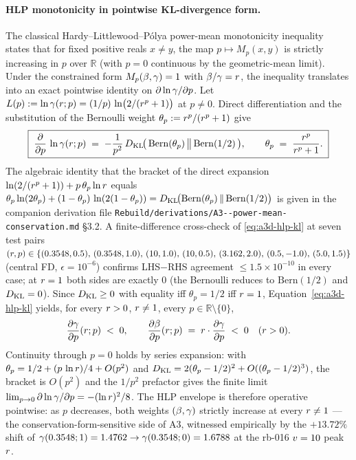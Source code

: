 \paragraph{HLP monotonicity in pointwise KL-divergence form.}
The classical Hardy--Littlewood--Pólya power-mean monotonicity
inequality~\cite{HLP1934} states that for fixed positive reals
$x \ne y$, the map $p \mapsto M_p(x, y)$ is strictly increasing in
$p$ over $\mathbb{R}$ (with $p = 0$ continuous by the
geometric-mean limit). Under the constrained form
$M_p(\beta, \gamma) = 1$ with $\beta/\gamma = r$, the
inequality translates into an exact pointwise identity on
$\partial \ln \gamma/\partial p$. Let
$L(p) := \ln \gamma(r; p) = (1/p)\,\ln\bigl(2/(r^p + 1)
\bigr)$ at $p \ne 0$. Direct differentiation and the substitution
of the Bernoulli weight
$\theta_p := r^p/(r^p + 1)$ give
\begin{equation}
  \boxed{\;
    \frac{\partial}{\partial p}\,\ln \gamma(r; p)
    \;=\;
    -\frac{1}{p^2}\,
    D_{\mathrm{KL}}\!\bigl(\,\mathrm{Bern}(\theta_p)\,\big\|\,
                    \mathrm{Bern}(1/2)\,\bigr),
    \qquad
    \theta_p \;=\; \frac{r^p}{r^p + 1}.
  \;}
  \label{eq:a3d-hlp-kl}
\end{equation}
The algebraic identity that the bracket of the direct expansion
$\ln(2/(r^p + 1)) + p\,\theta_p \ln r$ equals
$\theta_p \ln(2 \theta_p) + (1 - \theta_p)\,\ln(2(1 - \theta_p)) =
D_{\mathrm{KL}}\!\bigl(\mathrm{Bern}(\theta_p) \,\|\, \mathrm{Bern}(1/2)\bigr)$
is given in the companion derivation file
\texttt{Rebuild/derivations/A3{-}{-}power-mean-conservation.md}
§3.2. A finite-difference cross-check of
\eqref{eq:a3d-hlp-kl} at seven test pairs
$(r, p) \in \{(0.3548, 0.5),\,(0.3548, 1.0),\,(10, 1.0),\,
(10, 0.5),\,(3.162, 2.0),\,(0.5, -1.0),\,(5.0, 1.5)\}$
(central FD, $\epsilon = 10^{-6}$) confirms LHS$-$RHS agreement
$\le 1.5 \times 10^{-10}$ in every case; at $r = 1$ both sides
are exactly $0$ (the Bernoulli reduces to $\mathrm{Bern}(1/2)$ and
$D_{\mathrm{KL}} = 0$). Since $D_{\mathrm{KL}} \ge 0$ with equality iff
$\theta_p = 1/2$ iff $r = 1$,
Equation~\eqref{eq:a3d-hlp-kl} yields, for every $r > 0$,
$r \ne 1$, every $p \in \mathbb{R} \setminus \{0\}$,
\begin{equation}
  \frac{\partial \gamma}{\partial p}(r; p) \;<\; 0,
  \qquad
  \frac{\partial \beta}{\partial p}(r; p) \;=\;
  r \cdot \frac{\partial \gamma}{\partial p} \;<\; 0
  \quad (r > 0).
  \label{eq:a3d-mono-sign}
\end{equation}
Continuity through $p = 0$ holds by series expansion: with
$\theta_p = 1/2 + (p\,\ln r)/4 + O(p^2)$ and
$D_{\mathrm{KL}} = 2(\theta_p - 1/2)^2 + O((\theta_p - 1/2)^3)$, the bracket
is $O(p^2)$ and the $1/p^2$ prefactor gives the finite limit
$\lim_{p \to 0}\partial \ln \gamma/\partial p = -(\ln r)^2/8$.
The HLP envelope is therefore operative pointwise: as $p$
decreases, both weights $(\beta, \gamma)$ strictly increase at
every $r \ne 1$ — the conservation-form-sensitive side of A3,
witnessed empirically by the $+13.72\%$ shift of
$\gamma(0.3548; 1) = 1.4762 \to \gamma(0.3548; 0) = 1.6788$ at the
rb-016 $v = 10$ peak $r$.


